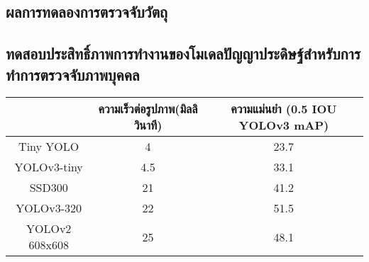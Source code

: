 \subsection{ผลการทดลองการตรวจจับวัตถุ}
\subsection{ทดสอบประสิทธิ์ภาพการทำงานของโมเดลปัญญาประดิษฐ์สำหรับการทำการตรวจจับภาพบุคคล}
\begin{tabular}{|c|c|c|}
		\hline
		{}&{ความเร็วต่อรูปภาพ(มิลลิวินาที)}&{ความแม่นยำ (0.5 IOU YOLOv3 mAP)}			\\
		\hline
		Tiny YOLO	 				& 4				& 23.7														\\
		YOLOv3-tiny				& 4.5				& 33.1				\\
		SSD300					& 21				& 41.2				\\
		YOLOv3-320				& 22				& 51.5				\\	
		YOLOv2 608x608			& 25				& 48.1				\\
	\hline
\end{tabular}
		